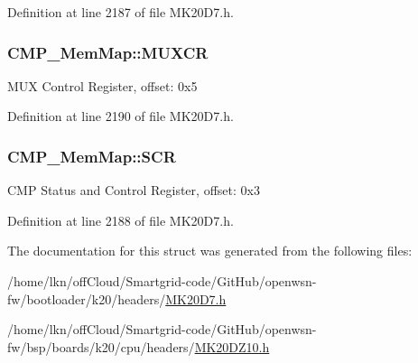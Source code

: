 Definition at line 2187 of file M\+K20\+D7.\+h.

\subsubsection[{\texorpdfstring{M\+U\+X\+CR}{MUXCR}}]{ C\+M\+P\+\_\+\+Mem\+Map\+::\+M\+U\+X\+CR}\hypertarget{struct_c_m_p___mem_map_a3b48de300c4b4116ebb942659a2948a2}{}\label{struct_c_m_p___mem_map_a3b48de300c4b4116ebb942659a2948a2}
M\+UX Control Register, offset\+: 0x5 

Definition at line 2190 of file M\+K20\+D7.\+h.

\subsubsection[{\texorpdfstring{S\+CR}{SCR}}]{ C\+M\+P\+\_\+\+Mem\+Map\+::\+S\+CR}\hypertarget{struct_c_m_p___mem_map_a3fe55f0243869b50fc54acb9c194d970}{}\label{struct_c_m_p___mem_map_a3fe55f0243869b50fc54acb9c194d970}
C\+MP Status and Control Register, offset\+: 0x3 

Definition at line 2188 of file M\+K20\+D7.\+h.



The documentation for this struct was generated from the following files\+:\begin{DoxyCompactItemize}
\item 
/home/lkn/off\+Cloud/\+Smartgrid-\/code/\+Git\+Hub/openwsn-\/fw/bootloader/k20/headers/\hyperlink{bootloader_2k20_2headers_2_m_k20_d7_8h}{M\+K20\+D7.\+h}\item 
/home/lkn/off\+Cloud/\+Smartgrid-\/code/\+Git\+Hub/openwsn-\/fw/bsp/boards/k20/cpu/headers/\hyperlink{_m_k20_d_z10_8h}{M\+K20\+D\+Z10.\+h}\end{DoxyCompactItemize}
